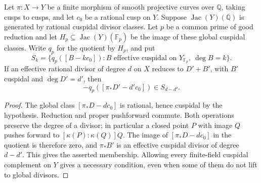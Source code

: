 \begin{lemma}\label{lem:nonic-cont-quotient-cusps}
Let $\pi:X\longrightarrow Y$ be a finite morphism of smooth projective
curves over $\mathbb Q$, taking cusps to cusps, and let $c_0$ be a
rational cusp on $Y$. Suppose $\operatorname{Jac}(Y)(\mathbb Q)$ is
generated by rational cuspidal divisor classes. Let $p$ be a common
prime of good reduction and let $H_p\subseteq\operatorname{Jac}(Y)(\mathbb F_p)$
be the image of these global cuspidal classes. Write $q_p$ for the
quotient by $H_p$, and put
\[
 S_k=\{q_p([B-kc_0]): B\text{ effective cuspidal on }Y_{\mathbb F_p},
 \ \deg B=k\}.
\]
If an effective rational divisor of degree $d$ on $X$ reduces to
$D'+B'$, with $B'$ cuspidal and $\deg D'=d'$, then
\[
 -q_p([\pi_*D'-d'c_0])\in S_{d-d'}.
\]
\end{lemma}
\begin{proof}
The global class $[\pi_*D-dc_0]$ is rational, hence cuspidal by the
hypothesis. Reduction and proper pushforward commute. Both operations
preserve the degree of a divisor; in particular a closed point $P$
with image $Q$ pushes forward to $[\kappa(P):\kappa(Q)]Q$.
The image of $[\pi_*D-dc_0]$ in the quotient is therefore zero, and
$\pi_*B'$ is an effective cuspidal divisor of degree $d-d'$.
This gives the asserted membership. Allowing every finite-field
cuspidal complement on $Y$ gives a necessary condition, even when
some of them do not lift to global divisors.
\end{proof}
